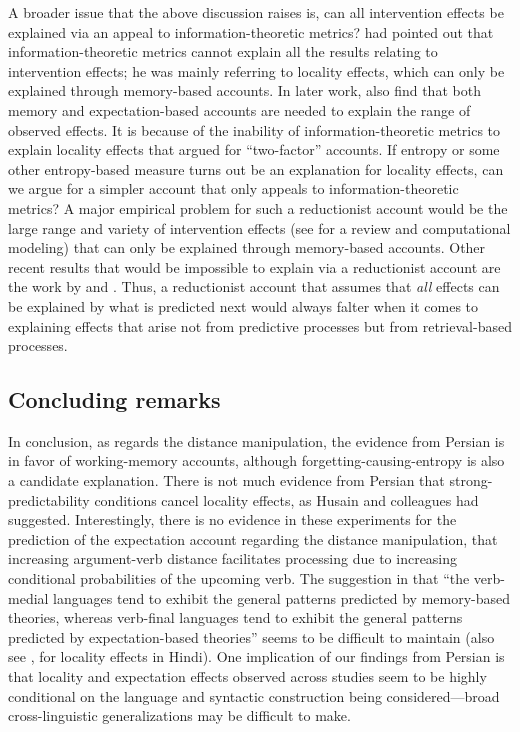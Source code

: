 \documentclass{frontiersSCNS}\usepackage{knitr} %
\begin{document}
A broader issue that the above discussion raises is, can all intervention effects be explained via an appeal to information-theoretic metrics?  
\citet{levy2008expectation} had pointed out that information-theoretic metrics cannot explain all the 
results relating to intervention effects; he was mainly referring to locality effects, which can only be explained through memory-based accounts. In later work, \citet{vasishth2011locality,levy2013expectation,levy2013syntactic} also find that both memory and expectation-based accounts are needed to explain the range of observed effects. It is because of the inability of information-theoretic metrics to explain locality effects that \citet{levy2008expectation} argued for ``two-factor'' accounts.
If entropy or some other entropy-based measure turns out be an explanation for locality effects, can we argue for a simpler account that only appeals to information-theoretic metrics? A major empirical problem for such a reductionist account would be the large range and variety of intervention effects (see \citealp{EngelmannJaegerVasishth2015} for a review and computational modeling) that can only be explained through memory-based accounts. Other recent results that would be impossible to explain via a reductionist account are the work by \citet{nicenboim2014individual} and \citet{NicenboimEtAlFrontiers2015Capacity}. Thus, a reductionist account that assumes that \textit{all} effects can be explained by what is predicted next
would always falter when it comes to explaining effects that arise not from predictive processes but from retrieval-based processes.

\subsection{Concluding remarks}

In conclusion, as regards the distance manipulation, the evidence from Persian is in favor of working-memory accounts, although forgetting-causing-entropy is also a candidate explanation. There is not much evidence from Persian that strong-predictability conditions cancel locality effects, as Husain and colleagues had suggested.  Interestingly, there is no evidence in these experiments for the prediction of the expectation account regarding the distance manipulation, that increasing argument-verb distance facilitates processing due to increasing conditional probabilities of the upcoming verb. The suggestion in \citep{levy2013syntactic} that ``the verb-medial languages tend to exhibit the general patterns predicted by memory-based theories, whereas verb-final languages tend to exhibit the general patterns predicted by expectation-based theories''  seems to be difficult to maintain (also see \citet{HusainVasishthNarayanan2015}, for locality effects in Hindi).
One implication of our findings from Persian is that locality and expectation effects observed across studies seem to be highly conditional on the language and syntactic construction being considered---broad cross-linguistic generalizations may be difficult to make.
\end{document}

